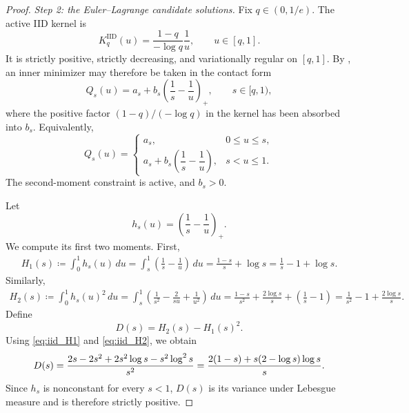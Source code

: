 \documentclass[10pt,a4paper]{amsart}
\newcommand{\KIID}{K^{\mathrm{IID}}}
\begin{document}
\begin{proof}
\medskip

\noindent\emph{Step 2: the Euler--Lagrange candidate solutions.}
Fix $q\in(0,1/e)$. The active IID kernel is
\begin{equation*}
    \KIID_q(u)
    =
    \frac{1-q}{-\log q}\frac1u,
    \qquad u\in[q,1].
\end{equation*}
It is strictly positive, strictly decreasing, and variationally
regular on $[q,1]$. By
, an inner minimizer may
therefore be taken in the contact form
\begin{equation}\label{eq:iid_contact_family}
    Q_s(u)
    =
    a_s+b_s\left(\frac1s-\frac1u\right)_+,
    \qquad
    s\in[q,1),
\end{equation}
where the positive factor $(1-q)/(-\log q)$ in the kernel has been
absorbed into $b_s$. Equivalently,
\begin{equation*}
    Q_s(u)
    =
    \begin{cases}
        a_s, & 0\leq u\leq s,\\[0.3em]
        a_s+b_s\left(\dfrac1s-\dfrac1u\right),
        & s<u\leq1.
    \end{cases}
\end{equation*}
The second-moment constraint is active, and $b_s>0$.

Let
\begin{equation*}
    h_s(u)
    =
    \left(\frac1s-\frac1u\right)_+.
\end{equation*}
We compute its first two moments. First,
\begin{align}
    H_1(s)
    \coloneqq
    \int_0^1h_s(u)\,du
    =
    \int_s^1
    \left(\frac1s-\frac1u\right)\,du
    =
    \frac{1-s}{s}+\log s
    =
    \frac1s-1+\log s.
    \label{eq:iid_H1}
\end{align}
Similarly,
\begin{align}
    H_2(s)
    \coloneqq
    \int_0^1h_s(u)^2\,du
    =
    \int_s^1
    \left(
        \frac1{s^2}
        -\frac{2}{su}
        +\frac1{u^2}
    \right)\,du
    =
    \frac{1-s}{s^2}
    +
    \frac{2\log s}{s}
    +
    \left(\frac1s-1\right)
    =
    \frac1{s^2}-1+\frac{2\log s}{s}.
    \label{eq:iid_H2}
\end{align}
Define
\begin{equation*}
    D(s)=H_2(s)-H_1(s)^2.
\end{equation*}
Using \eqref{eq:iid_H1} and \eqref{eq:iid_H2}, we obtain
\begin{align}
    D(s)
    =
    \frac{
        2s-2s^2+2s^2\log s-s^2\log^2s
    }{s^2}\notag
    =
    \frac{
        2(1-s)+s(2-\log s)\log s
    }{s}.
    \label{eq:iid_D}
\end{align}
Since $h_s$ is nonconstant for every $s<1$, $D(s)$ is its variance
under Lebesgue measure and is therefore strictly positive.


\end{proof}
\end{document}

